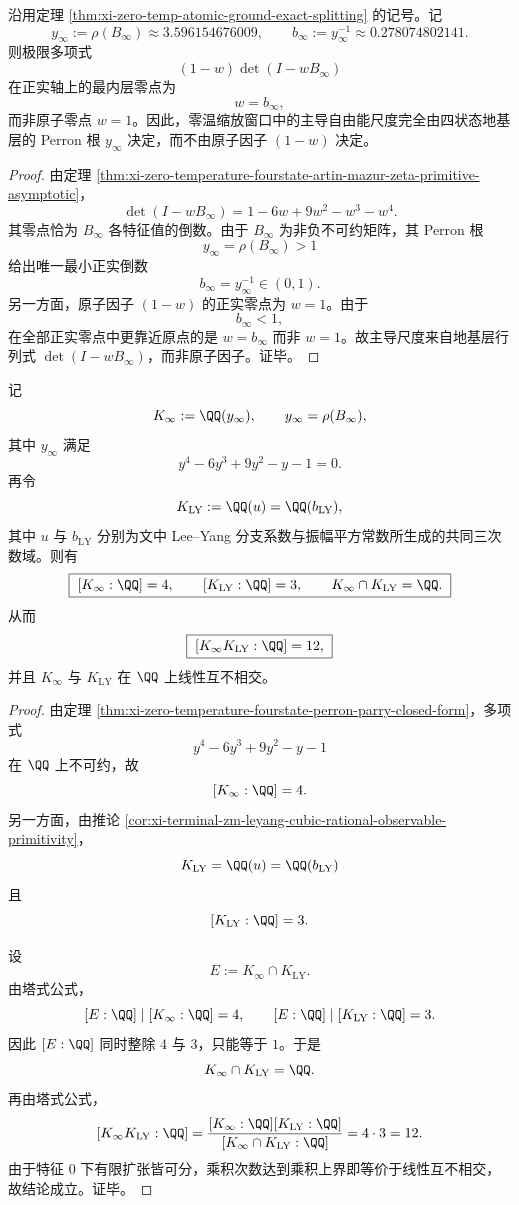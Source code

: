 \begin{corollary}[零温主极点由地基层而非原子层支配]\label{cor:xi-zero-temp-leading-pole-ground-dominance}
沿用定理 \ref{thm:xi-zero-temp-atomic-ground-exact-splitting} 的记号。记
\[
y_\infty:=\rho(B_\infty)\approx 3.596154676009,
\qquad
b_\infty:=y_\infty^{-1}\approx 0.278074802141.
\]
则极限多项式
\[
(1-w)\det(I-wB_\infty)
\]
在正实轴上的最内层零点为
\[
\boxed{\;w=b_\infty,\;}
\]
而非原子零点 \(w=1\)。因此，零温缩放窗口中的主导自由能尺度完全由四状态地基层的 Perron 根 \(y_\infty\) 决定，而不由原子因子 \((1-w)\) 决定。
\end{corollary}
\begin{proof}
由定理 \ref{thm:xi-zero-temperature-fourstate-artin-mazur-zeta-primitive-asymptotic}，
\[
\det(I-wB_\infty)=1-6w+9w^2-w^3-w^4.
\]
其零点恰为 \(B_\infty\) 各特征值的倒数。由于 \(B_\infty\) 为非负不可约矩阵，其 Perron 根
\[
y_\infty=\rho(B_\infty)>1
\]
给出唯一最小正实倒数
\[
b_\infty=y_\infty^{-1}\in(0,1).
\]
另一方面，原子因子 \((1-w)\) 的正实零点为 \(w=1\)。由于
\[
b_\infty<1,
\]
在全部正实零点中更靠近原点的是 \(w=b_\infty\) 而非 \(w=1\)。故主导尺度来自地基层行列式 \(\det(I-wB_\infty)\)，而非原子因子。证毕。
\end{proof}

\begin{theorem}\label{thm:xi-zero-temp-quartic-leyang-cubic-linear-disjoint}
记
\[
K_\infty:=\QQ(y_\infty),
\qquad
y_\infty=\rho(B_\infty),
\]
其中 \(y_\infty\) 满足
\[
y^4-6y^3+9y^2-y-1=0.
\]
再令
\[
K_{\mathrm{LY}}:=\QQ(u)=\QQ(b_{\mathrm{LY}}),
\]
其中 \(u\) 与 \(b_{\mathrm{LY}}\) 分别为文中 Lee--Yang 分支系数与振幅平方常数所生成的共同三次数域。则有
\[
\boxed{\;
[K_\infty:\QQ]=4,\qquad [K_{\mathrm{LY}}:\QQ]=3,\qquad
K_\infty\cap K_{\mathrm{LY}}=\QQ.\;}
\]
从而
\[
\boxed{\;
[K_\infty K_{\mathrm{LY}}:\QQ]=12,\;}
\]
并且 \(K_\infty\) 与 \(K_{\mathrm{LY}}\) 在 \(\QQ\) 上线性互不相交。
\end{theorem}
\begin{proof}
由定理 \ref{thm:xi-zero-temperature-fourstate-perron-parry-closed-form}，多项式
\[
y^4-6y^3+9y^2-y-1
\]
在 \(\QQ\) 上不可约，故
\[
[K_\infty:\QQ]=4.
\]
另一方面，由推论 \ref{cor:xi-terminal-zm-leyang-cubic-rational-observable-primitivity}，
\[
K_{\mathrm{LY}}=\QQ(u)=\QQ(b_{\mathrm{LY}})
\]
且
\[
[K_{\mathrm{LY}}:\QQ]=3.
\]

设
\[
E:=K_\infty\cap K_{\mathrm{LY}}.
\]
由塔式公式，
\[
[E:\QQ]\mid [K_\infty:\QQ]=4,
\qquad
[E:\QQ]\mid [K_{\mathrm{LY}}:\QQ]=3.
\]
因此 \([E:\QQ]\) 同时整除 \(4\) 与 \(3\)，只能等于 \(1\)。于是
\[
K_\infty\cap K_{\mathrm{LY}}=\QQ.
\]
再由塔式公式，
\[
[K_\infty K_{\mathrm{LY}}:\QQ]
=
\frac{[K_\infty:\QQ][K_{\mathrm{LY}}:\QQ]}{[K_\infty\cap K_{\mathrm{LY}}:\QQ]}
=
4\cdot 3
=
12.
\]
由于特征 \(0\) 下有限扩张皆可分，乘积次数达到乘积上界即等价于线性互不相交，故结论成立。证毕。
\end{proof}

\endinput
